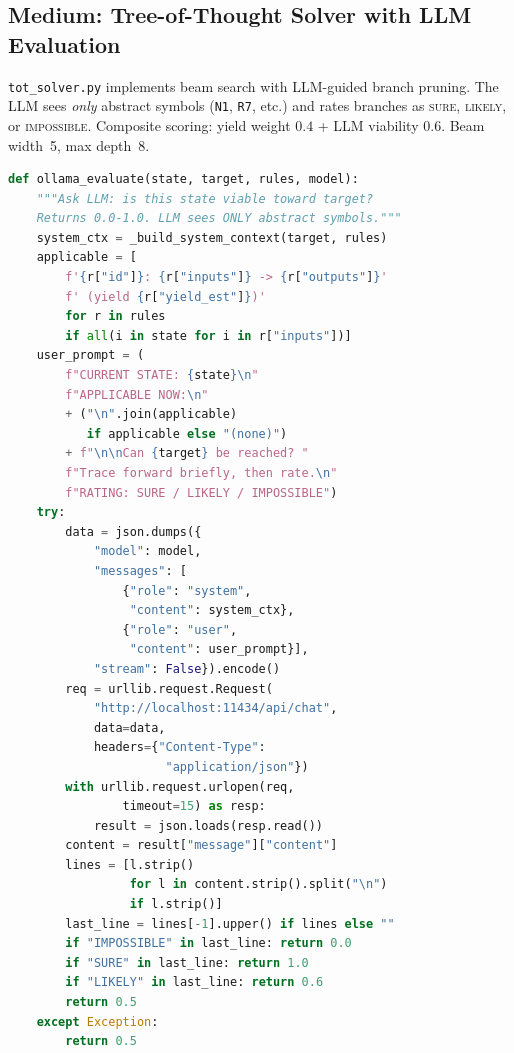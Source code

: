 \documentclass[letterpaper,11pt]{article}
\begin{document}
\subsection{Medium: Tree-of-Thought Solver with LLM Evaluation}\label{app:tot-solver}

\texttt{tot\_solver.py} implements beam search with LLM-guided branch pruning.
The LLM sees \emph{only} abstract symbols (\texttt{N1}, \texttt{R7}, etc.)
and rates branches as \textsc{sure}, \textsc{likely}, or \textsc{impossible}.
Composite scoring: yield weight $0.4$ + LLM viability $0.6$.
Beam width~5, max depth~8.

\begin{lstlisting}[language=Python,caption={tot\_solver.py --- core evaluation and search (abbreviated; 158 lines full)}]
def ollama_evaluate(state, target, rules, model):
    """Ask LLM: is this state viable toward target?
    Returns 0.0-1.0. LLM sees ONLY abstract symbols."""
    system_ctx = _build_system_context(target, rules)
    applicable = [
        f'{r["id"]}: {r["inputs"]} -> {r["outputs"]}'
        f' (yield {r["yield_est"]})'
        for r in rules
        if all(i in state for i in r["inputs"])]
    user_prompt = (
        f"CURRENT STATE: {state}\n"
        f"APPLICABLE NOW:\n"
        + ("\n".join(applicable)
           if applicable else "(none)")
        + f"\n\nCan {target} be reached? "
        f"Trace forward briefly, then rate.\n"
        f"RATING: SURE / LIKELY / IMPOSSIBLE")
    try:
        data = json.dumps({
            "model": model,
            "messages": [
                {"role": "system",
                 "content": system_ctx},
                {"role": "user",
                 "content": user_prompt}],
            "stream": False}).encode()
        req = urllib.request.Request(
            "http://localhost:11434/api/chat",
            data=data,
            headers={"Content-Type":
                      "application/json"})
        with urllib.request.urlopen(req,
                timeout=15) as resp:
            result = json.loads(resp.read())
        content = result["message"]["content"]
        lines = [l.strip()
                 for l in content.strip().split("\n")
                 if l.strip()]
        last_line = lines[-1].upper() if lines else ""
        if "IMPOSSIBLE" in last_line: return 0.0
        if "SURE" in last_line: return 1.0
        if "LIKELY" in last_line: return 0.6
        return 0.5
    except Exception:
        return 0.5


\end{lstlisting}
\end{document}
